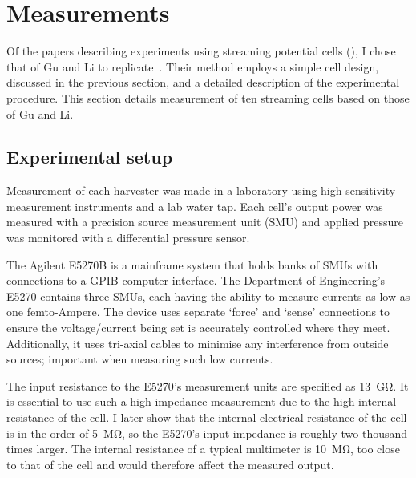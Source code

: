 \section{Measurements}
  \label{sect:part1_energyHarvesting_measuringStreamingCells}


  Of the papers describing experiments using streaming potential cells (\cite{Gu2000,Mala1997,Scales1992,VanderHeyden2006}), I chose that of Gu and Li to replicate~\cite{Gu2000}.
  Their method employs a simple cell design, discussed in the previous section, and a detailed description of the experimental procedure.
  This section details measurement of ten streaming cells based on those of Gu and Li.


  \subsection{Experimental setup}
    \label{sub:part1_energyHarvesting_measuringStreamingCells_experimentalSetup}


    Measurement of each harvester was made in a laboratory using high-sensitivity measurement instruments and a lab water tap.
    Each cell's output power was measured with a precision source measurement unit (SMU) and applied pressure was monitored with a differential pressure sensor.

    The Agilent E5270B is a mainframe system that holds banks of SMUs with connections to a GPIB computer interface.
    The Department of Engineering's E5270 contains three SMUs, each having the ability to measure currents as low as one femto-Ampere.
    The device uses separate `force' and `sense' connections to ensure the voltage/current being set is accurately controlled where they meet.
    Additionally, it uses tri-axial cables to minimise any interference from outside sources; important when measuring such low currents.

    The input resistance to the E5270's measurement units are specified as \SI{13}{\giga\ohm}.
    It is essential to use such a high impedance measurement due to the high internal resistance of the cell.
    I later show that the internal electrical resistance of the cell is in the order of \SI{5}{\mega\ohm}, so the E5270's input impedance is roughly two thousand times larger.
    The internal resistance of a typical multimeter is \SI{10}{\mega\ohm}, too close to that of the cell and would therefore affect the measured output.

